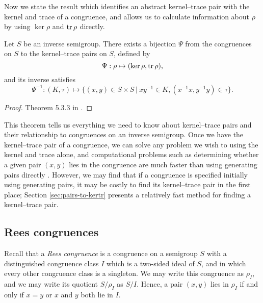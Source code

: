 Now we state the result which identifies an abstract kernel--trace pair with the
kernel and trace of a congruence, and allows us to calculate information about
$\rho$ by using $\ker \rho$ and $\operatorname{tr} \rho$ directly.

\begin{theorem}
  \label{thm:kernel-trace-pair}

  Let $S$ be an inverse semigroup.  There exists a bijection $\Psi$ from the
  congruences on $S$ to the kernel--trace pairs on $S$, defined by
  $$\Psi: \rho \mapsto (\ker\rho, \operatorname{tr}\rho),$$
  and its inverse satisfies
  $$\Psi^{-1} : (K,\tau) \mapsto
  \{(x,y) \in S \times S ~|~ xy^{-1} \in K, (x^{-1}x, y^{-1}y) \in \tau\}.$$
  \begin{proof}
    Theorem 5.3.3 in \cite{howie}.
  \end{proof}
\end{theorem}

This theorem tells us everything we need to know about kernel--trace pairs and
their relationship to congruences on an inverse semigroup.  Once we have the
kernel--trace pair of a congruence, we can solve any problem we wish to using the
kernel and trace alone, and computational problems such as determining whether a
given pair $(x,y)$ lies in the congruence are much faster than using
generating pairs directly \cite[\S 6.1.3]{mtorpey_msc}.  However, we may find
that if a congruence is specified initially using generating pairs, it may be
costly to find its kernel--trace pair in the first place; Section
\ref{sec:pairs-to-kertr} presents a relatively fast method for finding a kernel--trace pair.

\subsection{Rees congruences}
\label{sec:converting-rees}
Recall that a \textit{Rees congruence} is a congruence on a semigroup $S$ with a
distinguished congruence class $I$ which is a two-sided ideal of $S$, and in
which every other congruence class is a singleton.  We may write this congruence
as $\rho_I$, and we may write its quotient $S/\rho_I$ as $S/I$.  Hence, a pair
$(x,y)$ lies in $\rho_I$ if and only if $x=y$ or $x$ and $y$ both lie in $I$.

